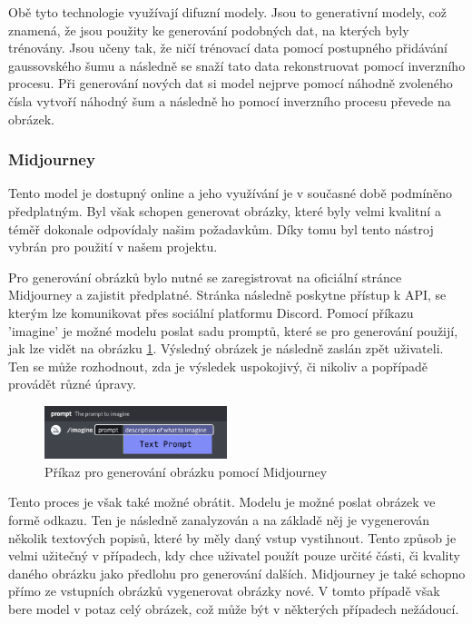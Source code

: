 Obě tyto technologie využívají difuzní modely. Jsou to generativní modely, což znamená, že jsou použity ke generování podobných dat, na kterých byly trénovány. Jsou učeny tak, že ničí trénovací data pomocí postupného přidávání gaussovského šumu a následně se snaží tato data rekonstruovat pomocí inverzního procesu. Při generování nových dat si model nejprve pomocí náhodně zvoleného čísla vytvoří náhodný šum a následně ho pomocí inverzního procesu převede na obrázek.

\subsubsection*{Midjourney}
Tento model je dostupný online a jeho využívání je v současné době podmíněno předplatným. Byl však schopen generovat obrázky, které byly velmi kvalitní a téměř  dokonale odpovídaly našim požadavkům. Díky tomu byl tento nástroj vybrán pro použití v našem projektu.

Pro generování obrázků bylo nutné se zaregistrovat na oficiální stránce Midjourney a zajistit předplatné. Stránka následně poskytne přístup k API, se kterým lze komunikovat přes sociální platformu Discord. Pomocí příkazu 'imagine' je možné modelu poslat sadu promptů, které se pro generování použijí, jak lze vidět na obrázku \ref{fig:mj_prompts}. Výsledný obrázek je následně zaslán zpět uživateli. Ten se může rozhodnout, zda je výsledek uspokojivý, či nikoliv a popřípadě provádět různé úpravy.

\begin{figure}[H]
    \centering
    \includegraphics[width=0.475\textwidth]{resources/figures/midjourney_prompts.png}
    \caption{Příkaz pro generování obrázku pomocí Midjourney\cite{midjourney}}
    \label{fig:mj_prompts}
\end{figure}

Tento proces je však také možné obrátit. Modelu je možné poslat obrázek ve formě odkazu. Ten je následně zanalyzován a na základě něj je vygenerován několik textových popisů, které by měly daný vstup vystihnout. Tento způsob je velmi užitečný v případech, kdy chce uživatel použít pouze určité části, či kvality daného obrázku jako předlohu pro generování dalších. Midjourney je také schopno přímo ze vstupních obrázků vygenerovat obrázky nové. V tomto případě však bere model v potaz celý obrázek, což může být v některých případech nežádoucí.

